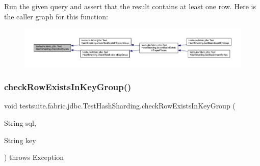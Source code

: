 Run the given query and assert that the result contains at least one row. Here is the caller graph for this function\+:
\nopagebreak
\begin{figure}[H]
\begin{center}
\leavevmode
\includegraphics[width=350pt]{classtestsuite_1_1fabric_1_1jdbc_1_1_test_hash_sharding_a62e92dd2a4d030bd60a3812e4561094b_icgraph}
\end{center}
\end{figure}
\mbox{\label{classtestsuite_1_1fabric_1_1jdbc_1_1_test_hash_sharding_a004334f5d0b85fae53d4d2034457dd84}} 
\subsubsection{\texorpdfstring{check\+Row\+Exists\+In\+Key\+Group()}{checkRowExistsInKeyGroup()}}
{\footnotesize\ttfamily void testsuite.\+fabric.\+jdbc.\+Test\+Hash\+Sharding.\+check\+Row\+Exists\+In\+Key\+Group (\begin{DoxyParamCaption}\item[{String}]{sql,  }\item[{String}]{key }\end{DoxyParamCaption}) throws Exception\hspace{0.3cm}{\ttfamily [protected]}}

